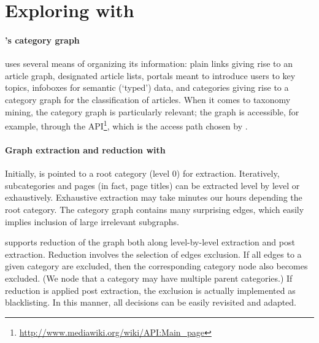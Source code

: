 
\section{Exploring \Wikipedia{} with \WikiTax} 
\label{S:tool}

\paragraph*{\textbf{\Wikipedia's category graph}}

\Wikipedia{} uses several means of organizing its information: plain links giving rise to an article graph, designated article lists, portals meant to introduce users to key topics, infoboxes for semantic (`typed') data, and categories giving rise to a category graph for the classification of articles. When it comes to taxonomy mining, the category graph is particularly relevant; the graph is accessible, for example, through the \MediaWiki{} API\footnote{\url{http://www.mediawiki.org/wiki/API:Main_page}}, which is the access path chosen by \WikiTax.


\paragraph*{\textbf{Graph extraction and reduction with \WikiTax}}

Initially, \WikiTax{} is pointed to a root category (level 0) for extraction. Iteratively, subcategories and pages (in fact, page titles) can be extracted level by level or exhaustively. Exhaustive extraction may take minutes our hours depending the root category. The \Wikipedia{} category graph contains many surprising edges, which easily implies inclusion of large irrelevant subgraphs. 

\WikiTax{} supports reduction of the graph both along level-by-level extraction and post extraction. Reduction involves the selection of edges exclusion. If all edges to a given category are excluded, then the corresponding category node also becomes excluded. (We node that a category may have multiple parent categories.) If reduction is applied post extraction, the exclusion is actually implemented as blacklisting. In this manner, all decisions can be easily revisited and adapted.


